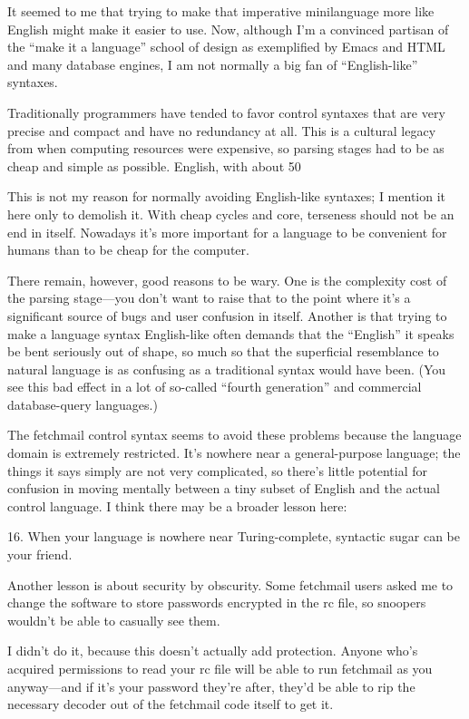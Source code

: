 \documentclass[a4paper,12pt,UTF8,twoside]{ctexbook}
\begin{document}
It seemed to me that trying to make that imperative minilanguage more like English might make it easier to use. Now, although I'm a convinced partisan of the ``make it a language'' school of design as exemplified by Emacs and HTML and many database engines, I am not normally a big fan of ``English-like'' syntaxes.

Traditionally programmers have tended to favor control syntaxes that are very precise and compact and have no redundancy at all. This is a cultural legacy from when computing resources were expensive, so parsing stages had to be as cheap and simple as possible. English, with about 50%

This is not my reason for normally avoiding English-like syntaxes; I mention it here only to demolish it. With cheap cycles and core, terseness should not be an end in itself. Nowadays it's more important for a language to be convenient for humans than to be cheap for the computer.

There remain, however, good reasons to be wary. One is the complexity cost of the parsing stage—you don't want to raise that to the point where it's a significant source of bugs and user confusion in itself. Another is that trying to make a language syntax English-like often demands that the ``English'' it speaks be bent seriously out of shape, so much so that the superficial resemblance to natural language is as confusing as a traditional syntax would have been. (You see this bad effect in a lot of so-called ``fourth generation'' and commercial database-query languages.)

The fetchmail control syntax seems to avoid these problems because the language domain is extremely restricted. It's nowhere near a general-purpose language; the things it says simply are not very complicated, so there's little potential for confusion in moving mentally between a tiny subset of English and the actual control language. I think there may be a broader lesson here:

16. When your language is nowhere near Turing-complete, syntactic sugar can be your friend.

Another lesson is about security by obscurity. Some fetchmail users asked me to change the software to store passwords encrypted in the rc file, so snoopers wouldn't be able to casually see them.

I didn't do it, because this doesn't actually add protection. Anyone who's acquired permissions to read your rc file will be able to run fetchmail as you anyway—and if it's your password they're after, they'd be able to rip the necessary decoder out of the fetchmail code itself to get it.
\end{document}
